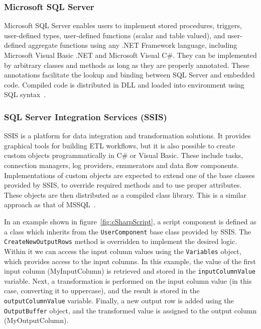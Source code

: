 \subsubsection{Microsoft SQL Server}
Microsoft SQL Server enables users to implement stored procedures, triggers, user-defined types, user-defined functions (scalar and table valued), and user-defined aggregate functions using any .NET Framework language, including Microsoft Visual Basic .NET and Microsoft Visual C\#. They can be implemented by arbitrary classes and methods as long as they are properly annotated. These annotations facilitate the lookup and binding between SQL Server and embedded code. Compiled code is distributed in DLL and loaded into environment using SQL syntax~\cite{mssql}.

\subsubsection{SQL Server Integration Services (SSIS)}
SSIS is a platform for data integration and transformation solutions. It provides graphical tools for building ETL workflows, but it is also possible to create custom objects programmatically in C\# or Visual Basic. These include tasks, connection managers, log providers, enumerators and data flow components. Implementations of custom objects are expected to extend one of the base classes provided by SSIS, to override required methods and to use proper attributes. These objects are then distributed as a compiled class library. This is a similar approach as that of MSSQL~\cite{ssis}.
\par
In an example shown in figure~\ref{fig:cSharpScript}, a script component is defined as a class which inherits from the \texttt{UserComponent} base class provided by SSIS. The \texttt{CreateNewOutputRows} method is overridden to implement the desired logic. Within it we can access the input column values using the \texttt{Variables} object, which provides access to the input columns. In this example, the value of the first input column (MyInputColumn) is retrieved and stored in the \texttt{inputColumnValue} variable. Next, a transformation is performed on the input column value (in this case, converting it to uppercase), and the result is stored in the \texttt{outputColumnValue} variable. Finally, a new output row is added using the \texttt{OutputBuffer} object, and the transformed value is assigned to the output column (MyOutputColumn).


